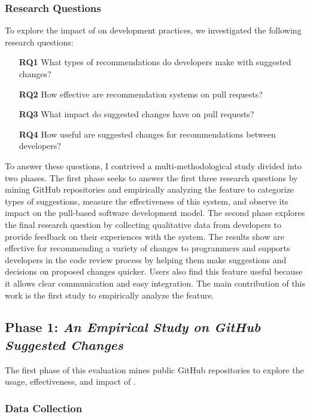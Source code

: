 \subsubsection{Research Questions}

To explore the impact of \sugg on development practices, we investigated the following research questions:

\begin{itemize}[topsep=0pt,itemsep=-1ex,partopsep=1ex,parsep=1ex]
    \item[\textbf{RQ1}] What types of recommendations do developers make with suggested changes?
    \item[\textbf{RQ2}] How effective are recommendation systems on pull requests?
    \item[\textbf{RQ3}] What impact do suggested changes have on pull requests?
    \item[\textbf{RQ4}] How useful are suggested changes for recommendations between developers?
\end{itemize}

To answer these questions, I contrived a multi-methodological study divided into two phases. The first phase seeks to answer the first three research questions by mining GitHub repositories and empirically analyzing the \sugg feature to categorize types of suggestions, measure the effectiveness of this system, and observe its impact on the pull-based software development model. The second phase explores the final research question by collecting qualitative data from developers to provide feedback on their experiences with the \suggs system. The results show \sugg are effective for recommending a variety of changes to programmers and supports developers in the code review process by helping them make suggestions and decisions on proposed changes quicker. Users also find this feature useful because it allows clear communication and easy integration. The main contribution of this work is the first study to empirically analyze the \suggs feature.

\subsection{Phase 1: \textit{An Empirical Study on GitHub Suggested Changes}}

The first phase of this evaluation mines public GitHub repositories to explore the usage, effectiveness, and impact of \sugg.

\subsubsection{Data Collection}

